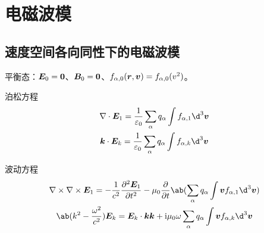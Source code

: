 \section{电磁波模}

\subsection{速度空间各向同性下的电磁波模}

平衡态：$\bm{E}_0=\bm{0}$、$\bm{B}_0=\bm{0}$、$f_{\alpha,0}(\bm{r},\bm{v})=f_{\alpha,0}(v^2)$。

泊松方程
\begin{equation}\begin{gathered}
\dive{\vector{E}_1} = \frac{1}{\varepsilon_0}
\sum_\alpha q_\alpha \int f_{\alpha,1} \d^3\vector{v} \\
\vector{k} \cdot \vector{E}_k
= \frac{1}{\varepsilon_0}
\sum_\alpha q_\alpha \int f_{\alpha,k} \d^3\vector{v}
\end{gathered}\end{equation}

波动方程
\begin{equation}\begin{gathered}
\curl{\curl{\vector{E}_1}} =
- \frac{1}{c^2} \pdv[2]{\vector{E}_1}{t}
- \mu_0 \pdv*{\ab(
    \sum_\alpha q_\alpha \int \vector{v} f_{\alpha,1} \d^3\vector{v}
)}{t} \\
\ab(k^2 - \frac{\omega^2}{c^2}) \vector{E}_k
= \vector{E}_k\cdot\vector{k}\vector{k} + \im\mu_0\omega
    \sum_\alpha q_\alpha \int \vector{v} f_{\alpha,k} \d^3\vector{v}
\end{gathered}\end{equation}

